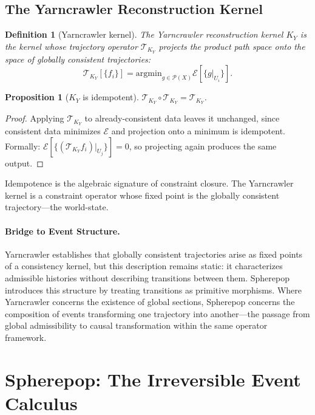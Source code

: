\documentclass[12pt]{article}
\newtheorem{proposition}[theorem]{Proposition}
\newtheorem{definition}[theorem]{Definition}
\newcommand{\Pcal}{\mathcal{P}}
\begin{document}
\subsection{The Yarncrawler Reconstruction Kernel}

\begin{definition}[Yarncrawler kernel]
The \emph{Yarncrawler reconstruction kernel} $K_Y$ is the kernel whose
trajectory operator $\mathcal{T}_{K_Y}$ projects the product path space
onto the space of globally consistent trajectories:
\[
  \mathcal{T}_{K_Y}[\{f_i\}] = \mathrm{argmin}_{g\in\Pcal(X)}
  \mathcal{E}[\{g|_{U_i}\}].
\]
\end{definition}

\begin{proposition}[$K_Y$ is idempotent]
\label{prop:idempotent}
$\mathcal{T}_{K_Y} \circ \mathcal{T}_{K_Y} = \mathcal{T}_{K_Y}$.
\end{proposition}

\begin{proof}
Applying $\mathcal{T}_{K_Y}$ to already-consistent data leaves it unchanged,
since consistent data minimizes $\mathcal{E}$ and projection onto a minimum
is idempotent. Formally: $\mathcal{E}[\{(\mathcal{T}_{K_Y} f_i)|_{U_j}\}] = 0$,
so projecting again produces the same output.
\end{proof}

Idempotence is the algebraic signature of constraint closure. The
Yarncrawler kernel is a constraint operator whose fixed point is the
globally consistent trajectory---the world-state.

\paragraph{Bridge to Event Structure.}
Yarncrawler establishes that globally consistent trajectories arise as
fixed points of a consistency kernel, but this description remains static:
it characterizes admissible histories without describing transitions between
them. Spherepop introduces this structure by treating transitions as
primitive morphisms. Where Yarncrawler concerns the existence of global
sections, Spherepop concerns the composition of events transforming one
trajectory into another---the passage from global admissibility to causal
transformation within the same operator framework.

\section{Spherepop: The Irreversible Event Calculus}
\label{sec:spherepop}
\end{document}
